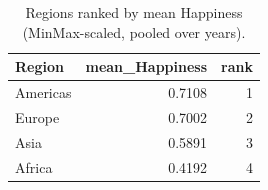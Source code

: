 \begin{table}
\caption{Regions ranked by mean Happiness (MinMax-scaled, pooled over years).}
\label{tab:region-rank}
\begin{tabular}{lrr}
\toprule
Region & mean_Happiness & rank \\
\midrule
Americas & 0.7108 & 1 \\
Europe & 0.7002 & 2 \\
Asia & 0.5891 & 3 \\
Africa & 0.4192 & 4 \\
\bottomrule
\end{tabular}
\end{table}
